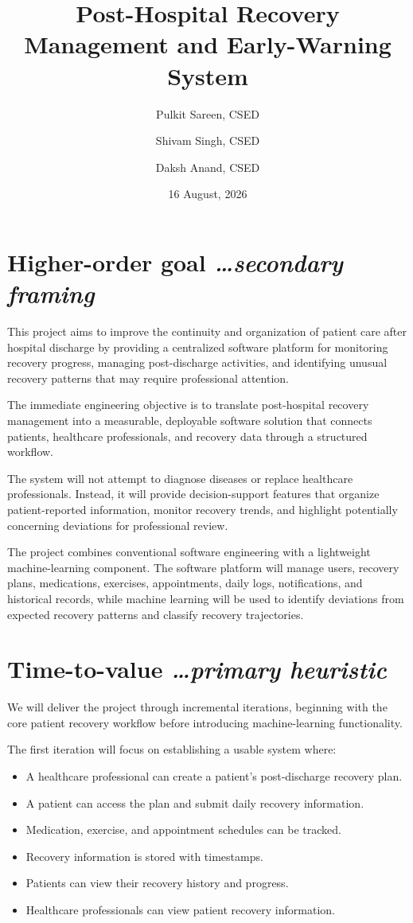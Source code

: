 \documentclass[11pt,a4paper]{article}
\title{Post-Hospital Recovery Management and Early-Warning System}
\author{
  Pulkit Sareen, CSED \and
  Shivam Singh, CSED \and
  Daksh Anand, CSED%
}
\date{16 August, 2026}
\newcommand{\BvrHint}[1]{%
  {\normalfont\normalsize\itshape\hfill #1}}
\begin{document}
\maketitle

\section{Higher-order goal%
  \BvrHint{\ldots secondary framing}}

This project aims to improve the continuity and organization
of patient care after hospital discharge by providing a centralized software
platform for monitoring recovery progress, managing post-discharge activities,
and identifying unusual recovery patterns that may require professional
attention.

The immediate engineering objective is to translate
post-hospital recovery management into a measurable, deployable software
solution that connects patients, healthcare professionals, and recovery data
through a structured workflow.

The system will not attempt to diagnose diseases or replace
healthcare professionals. Instead, it will provide decision-support features
that organize patient-reported information, monitor recovery trends, and
highlight potentially concerning deviations for professional review.

The project combines conventional software engineering with a
lightweight machine-learning component. The software platform will manage
users, recovery plans, medications, exercises, appointments, daily logs,
notifications, and historical records, while machine learning will be used to
identify deviations from expected recovery patterns and classify recovery
trajectories.

\section{Time-to-value %
\BvrHint{\ldots primary heuristic}}

We will deliver the project through incremental iterations,
beginning with the core patient recovery workflow before introducing
machine-learning functionality.

The first iteration will focus on establishing a usable
system where:
\begin{itemize}[leftmargin=0.7cm]
    \item A healthcare professional can create a patient's post-discharge recovery plan.
    \item A patient can access the plan and submit daily recovery information.
    \item Medication, exercise, and appointment schedules can be tracked.
    \item Recovery information is stored with timestamps.
    \item Patients can view their recovery history and progress.
    \item Healthcare professionals can view patient recovery information.
\end{itemize}
\end{document}
